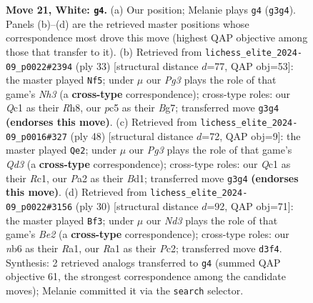 \documentclass[11pt]{article}
\begin{document}
\begin{figure}[p]
\caption{\textbf{Move 21, White: \texttt{g4}.} (a) Our position; Melanie plays \texttt{g4} (\texttt{g3g4}). Panels (b)--(d) are the retrieved master positions whose correspondence most drove this move (highest QAP objective among those that transfer to it). (b) Retrieved from \texttt{lichess\_elite\_2024-09\_p0022\#2394} (ply 33) [structural distance $d$=77, QAP obj=53]: the master played \texttt{Nf5}; under $\mu$ our \emph{Pg3} plays the role of that game's \emph{Nh3} (a \textbf{cross-type} correspondence); cross-type roles: our \emph{Q}c1 as their \emph{R}h8, our \emph{p}c5 as their \emph{B}g7; transferred move \texttt{g3g4} \textbf{(endorses this move)}. (c) Retrieved from \texttt{lichess\_elite\_2024-09\_p0016\#327} (ply 48) [structural distance $d$=72, QAP obj=9]: the master played \texttt{Qe2}; under $\mu$ our \emph{Pg3} plays the role of that game's \emph{Qd3} (a \textbf{cross-type} correspondence); cross-type roles: our \emph{Q}c1 as their \emph{R}c1, our \emph{P}a2 as their \emph{B}d1; transferred move \texttt{g3g4} \textbf{(endorses this move)}. (d) Retrieved from \texttt{lichess\_elite\_2024-09\_p0022\#3156} (ply 30) [structural distance $d$=92, QAP obj=71]: the master played \texttt{Bf3}; under $\mu$ our \emph{Nd3} plays the role of that game's \emph{Be2} (a \textbf{cross-type} correspondence); cross-type roles: our \emph{n}b6 as their \emph{R}a1, our \emph{R}a1 as their \emph{P}c2; transferred move \texttt{d3f4}. Synthesis: 2 retrieved analogs transferred to \texttt{g4} (summed QAP objective 61, the strongest correspondence among the candidate moves); Melanie committed it via the \texttt{search} selector.}
\label{fig:thought-m40}
\end{figure}

\clearpage
\end{document}
